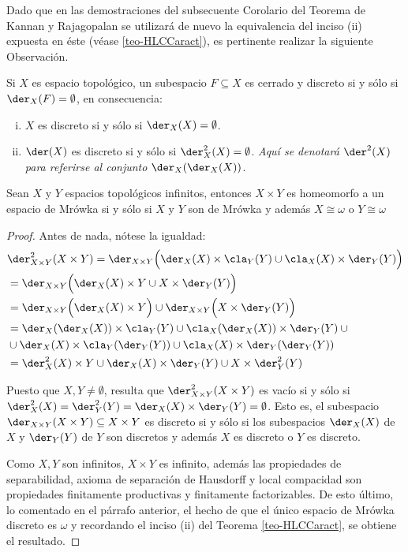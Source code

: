 	Dado que en las demostraciones del subsecuente Corolario del Teorema de Kannan y Rajagopalan se utilizará de nuevo la equivalencia del inciso (ii) expuesta en éste (véase \ref{teo-HLCCaract}), es pertinente realizar la siguiente Observación.
	
	\begin{observacion}
		Si $X$ es espacio topológico, un subespacio $F \subseteq X$ es cerrado y discreto si y sólo si $\der_X(F)=\emptyset$, en consecuencia:
		\begin{enumerate}[i)]
			\item $X$ es discreto si y sólo si $\der_X(X) = \emptyset$.
			\item $\der(X)$ es discreto si y sólo si $\der^2_X(X) = \emptyset$. \textit{Aquí se denotará $\der^2(X)$ para referirse al conjunto $\der_X(\der_X(X))$}.
		\end{enumerate}
	\end{observacion}
	
	\begin{lema}
		Sean $X$ y $Y$ espacios topológicos infinitos, entonces $X \times Y$ es homeomorfo a un espacio de Mrówka si y sólo si $X$ y $Y$ son de Mrówka y además $X \cong \omega$ o $Y \cong \omega$
	\end{lema}
	
	\begin{proof} 
		Antes de nada, nótese la igualdad:
	\begin{align*}
		& \der^2_{X \times Y} (X \times Y) = \der_{X \times Y} \Big( \der_X(X) \times \cla_Y(Y) \cup \cla_X(X) \times \der_Y(Y) \Big) \\
		& = \der_{X \times Y} \Big( \der_X(X) \times Y \cup X \times \der_Y(Y) \Big) \\
		& = \der_{X \times Y} \Big( \der_X(X) \times Y \Big) \cup \der_{X \times Y} \Big( X \times \der_Y(Y) \Big) \\
		& = \der_X(\der_X(X)) \times \cla_Y(Y) \cup \cla_X(\der_X(X)) \times \der_Y(Y) \: \cup \\
		& \cup \der_X(X) \times \cla_Y(\der_Y(Y)) \cup \cla_X(X) \times \der_Y(\der_Y(Y)) \\
		& = \der^2_X(X) \times Y \cup \der_X(X) \times \der_Y(Y) \cup X \times \der^2_Y(Y)
	\end{align*}
	
		Puesto que $X,Y \neq \emptyset$, resulta que $\der^2_{X \times Y} (X \times Y)$ es vacío si y sólo si $\der^2_X(X) = \der^2_Y(Y) = \der_X(X) \times \der_Y(Y) = \emptyset$. Esto es, el subespacio $\der_{X \times Y}(X \times Y) \subseteq X \times Y$ es discreto si y sólo si los subespacios $\der_X(X)$ de $X$ y $\der_Y(Y)$ de $Y$ son discretos y además $X$ es discreto o $Y$ es discreto.
		
		Como $X,Y$ son infinitos, $X \times Y$ es infinito, además las propiedades de separabilidad, axioma de separación de Hausdorff y local compacidad son propiedades finitamente productivas y finitamente factorizables. De esto último, lo comentado en el párrafo anterior, el hecho de que el único espacio de Mrówka discreto es $\omega$ y recordando el inciso (ii) del Teorema \ref{teo-HLCCaract}, se obtiene el resultado.
	\end{proof}
	

